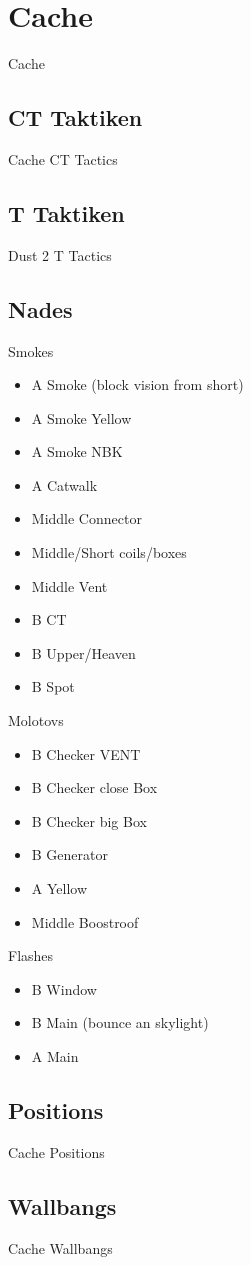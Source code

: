 \newpage




\chapter{Cache}
\label{chap:cache}
Cache

\section{CT Taktiken}
\label{sect:cache_ct}
Cache CT Tactics

\section{T Taktiken}
\label{sect:cache_t}
Dust 2 T Tactics

\section{Nades}
\label{sect:cache_nades}
Smokes
\begin{itemize}
\item A Smoke (block vision from short)
\item A Smoke Yellow
\item A Smoke NBK
\item A Catwalk
\item Middle Connector
\item Middle/Short coils/boxes
\item Middle Vent
\item B CT
\item B Upper/Heaven
\item B Spot
\end{itemize}

Molotovs
\begin{itemize}
\item B Checker VENT
\item B Checker close Box
\item B Checker big Box
\item B Generator
\item A Yellow
\item Middle Boostroof
\end{itemize}

Flashes
\begin{itemize}
\item B Window
\item B Main (bounce an skylight)
\item A Main
\end{itemize}

\section{Positions}
\label{sect:cache_positions}
Cache Positions

\section{Wallbangs}
\label{sect:cache_wallbangs}
Cache Wallbangs